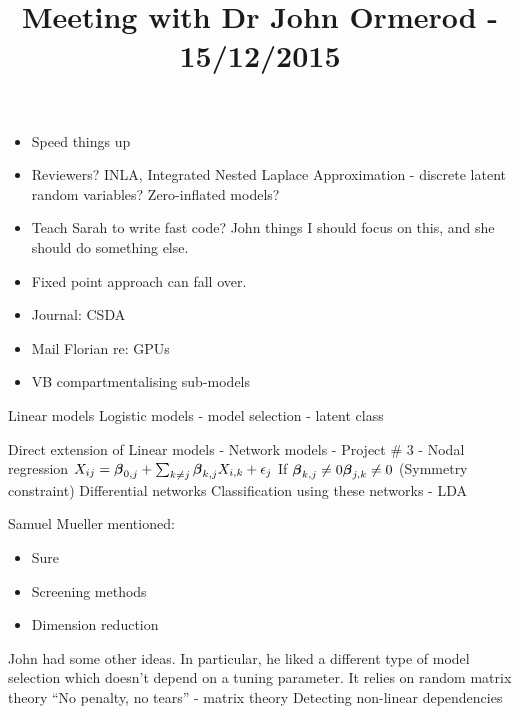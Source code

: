 \documentclass{amsart}
\title{Meeting with Dr John Ormerod - 15/12/2015}
\begin{document}
\maketitle

\begin{itemize}
\item Speed things up
\item Reviewers? INLA, Integrated Nested Laplace Approximation - discrete latent random variables? Zero-inflated models?
\item Teach Sarah to write fast code? John things I should focus on this, and she should do something else.
\item Fixed point approach can fall over.
\item Journal: CSDA
\item Mail Florian re: GPUs
\item VB compartmentalising sub-models
\end{itemize}

Linear models
Logistic models
- model selection
- latent class

Direct extension of Linear models - Network models - Project \# 3
 - Nodal regression
$X_{ij} = {\boldsymbol \beta}_{0, j} + \sum_{k \ne j} {\boldsymbol \beta}_{k, j} X_{i, k} + \epsilon_j$
If ${\boldsymbol \beta}_{k, j} \ne 0 {\boldsymbol \beta}_{j, k} \ne 0$ (Symmetry constraint)
Differential networks
Classification using these networks - LDA

Samuel Mueller mentioned:
\begin{itemize}
\item Sure
\item Screening methods
\item Dimension reduction
\end{itemize}

John had some other ideas. In particular, he liked a different type of model selection which doesn't depend
on a tuning parameter.
It relies on random matrix theory
``No penalty, no tears'' - matrix theory
Detecting non-linear dependencies
\end{document}
